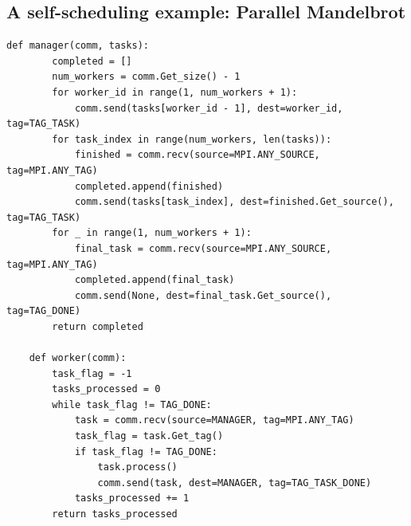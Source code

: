 \documentclass[unicode,11pt,a4paper,oneside,numbers=endperiod,openany]{scrartcl}
\begin{document}
\subsection{ A self-scheduling example: Parallel Mandelbrot}
\begin{lstlisting}[language=MyPython, style=mystyle, caption={Manager-Worker Model in MPI}]
    def manager(comm, tasks):
        completed = []
        num_workers = comm.Get_size() - 1
        for worker_id in range(1, num_workers + 1):
            comm.send(tasks[worker_id - 1], dest=worker_id, tag=TAG_TASK)
        for task_index in range(num_workers, len(tasks)):
            finished = comm.recv(source=MPI.ANY_SOURCE, tag=MPI.ANY_TAG)
            completed.append(finished)
            comm.send(tasks[task_index], dest=finished.Get_source(), tag=TAG_TASK)
        for _ in range(1, num_workers + 1):
            final_task = comm.recv(source=MPI.ANY_SOURCE, tag=MPI.ANY_TAG)
            completed.append(final_task)
            comm.send(None, dest=final_task.Get_source(), tag=TAG_DONE)
        return completed
    
    def worker(comm):
        task_flag = -1
        tasks_processed = 0
        while task_flag != TAG_DONE:
            task = comm.recv(source=MANAGER, tag=MPI.ANY_TAG)
            task_flag = task.Get_tag()
            if task_flag != TAG_DONE:
                task.process()
                comm.send(task, dest=MANAGER, tag=TAG_TASK_DONE)
            tasks_processed += 1
        return tasks_processed
 \end{lstlisting}
    
\end{document}
